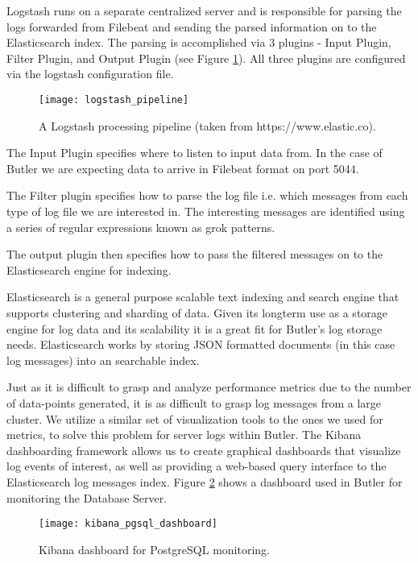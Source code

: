 Logstash runs on a separate centralized server and is responsible for parsing the logs forwarded from Filebeat and sending the parsed information on to the Elasticsearch index. The parsing is accomplished via 3 plugins - Input Plugin, Filter Plugin, and Output Plugin (see Figure \ref{fig:logstash_pipeline}). All three plugins are configured via the logstash configuration file.

\begin{figure}[h]
\texttt{[image: logstash\_pipeline]}
\centering
\caption {A Logstash processing pipeline (taken from https://www.elastic.co).}
\label{fig:logstash_pipeline}
\end{figure}

The Input Plugin specifies where to listen to input data from. In the case of Butler we are expecting data to arrive in Filebeat format on port 5044.

The Filter plugin specifies how to parse the log file i.e. which messages from each type of log file we are interested in. The interesting messages are identified using a series of regular expressions known as grok patterns. 

The output plugin then specifies how to pass the filtered messages on to the Elasticsearch engine for indexing.

Elasticsearch is a general purpose scalable text indexing and search engine that supports clustering and sharding of data. Given its longterm use as a storage engine for log data and its scalability it is a great fit for Butler's log storage needs. Elasticsearch works by storing JSON formatted documents (in this case log messages) into an searchable index. 

Just as it is difficult to grasp and analyze performance metrics due to the number of data-points generated, it is as difficult to grasp log messages from a large cluster. We utilize a similar set of visualization tools to the ones we used for metrics, to solve this problem for server logs within Butler. The Kibana dashboarding framework allows us to create graphical dashboards that visualize log events of interest, as well as providing a web-based query interface to the Elasticsearch log messages index. Figure \ref{fig:kibana_pgsql_dashboard} shows a dashboard used in Butler for monitoring the Database Server.

\begin{figure}[h]
\texttt{[image: kibana\_pgsql\_dashboard]}
\centering
\caption {Kibana dashboard for PostgreSQL monitoring.}
\label{fig:kibana_pgsql_dashboard}
\end{figure}
 
